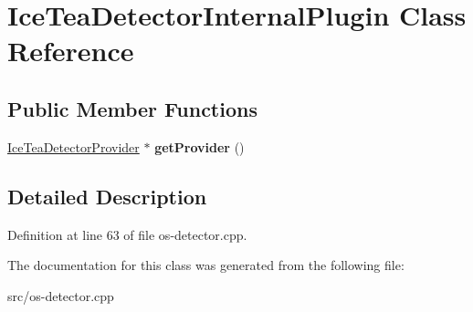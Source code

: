 \hypertarget{class_ice_tea_detector_internal_plugin}{}\section{Ice\+Tea\+Detector\+Internal\+Plugin Class Reference}
\label{class_ice_tea_detector_internal_plugin}
\subsection*{Public Member Functions}
\begin{DoxyCompactItemize}
\item 
\hyperlink{class_ice_tea_detector_provider}{Ice\+Tea\+Detector\+Provider} $\ast$ {\bfseries get\+Provider} ()\hypertarget{class_ice_tea_detector_internal_plugin_aec26b5b6556b47022059a9ee893177db}{}\label{class_ice_tea_detector_internal_plugin_aec26b5b6556b47022059a9ee893177db}

\end{DoxyCompactItemize}


\subsection{Detailed Description}


Definition at line 63 of file os-\/detector.\+cpp.



The documentation for this class was generated from the following file\+:\begin{DoxyCompactItemize}
\item 
src/os-\/detector.\+cpp\end{DoxyCompactItemize}
